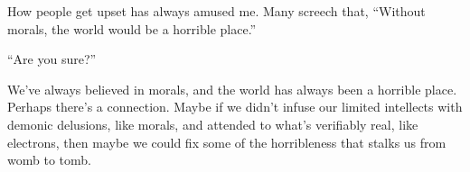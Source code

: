 How people get upset has always amused me. Many screech that, ``Without
morals, the world would be a horrible place.''

``Are you sure?''

We've always believed in morals, and the world has always been a
horrible place. Perhaps there's a connection. Maybe if we didn't infuse
our limited intellects with demonic delusions, like morals, and attended
to what's verifiably real, like electrons, then maybe we could fix some
of the horribleness that stalks us from womb to tomb.





%
 

